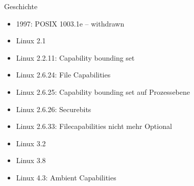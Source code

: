 \documentclass[usenames,dvipsnames,10pt]{beamer}
\begin{document}
\begin{frame}[<+->]{Geschichte}
	\begin{itemize}
	\item 1997: POSIX 1003.1e – withdrawn
	\item Linux 2.1
	\item Linux 2.2.11: Capability bounding set
	\item Linux 2.6.24: File Capabilities
	\item Linux 2.6.25: Capability bounding set auf Prozessebene
	\item Linux 2.6.26: Securebits
	\item Linux 2.6.33: Filecapabilities nicht mehr Optional
	\item Linux 3.2%
	\item Linux 3.8
	\item Linux 4.3: Ambient Capabilities
	\end{itemize}
\end{frame}
\end{document}

